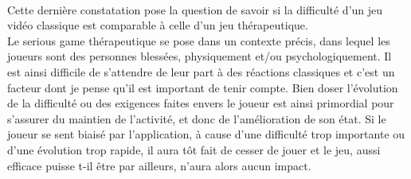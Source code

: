 \paragraph{}Cette dernière constatation pose la question de savoir si la difficulté d'un jeu vidéo classique est comparable à celle d'un jeu thérapeutique.\\ Le serious game thérapeutique se pose dans un contexte précis, dans lequel les joueurs sont des personnes blessées, physiquement et/ou psychologiquement. Il est ainsi difficile de s'attendre de leur part à des réactions classiques et c'est un facteur dont je pense qu'il est important de tenir compte. Bien doser l'évolution de la difficulté ou des exigences faites envers le joueur est ainsi primordial pour s'assurer du maintien de l'activité, et donc de l'amélioration de son état. Si le joueur se sent biaisé par l'application, à cause d'une difficulté trop importante ou d'une évolution trop rapide, il aura tôt fait de cesser de jouer et le jeu, aussi efficace puisse t-il être par ailleurs, n'aura alors aucun impact.
		
